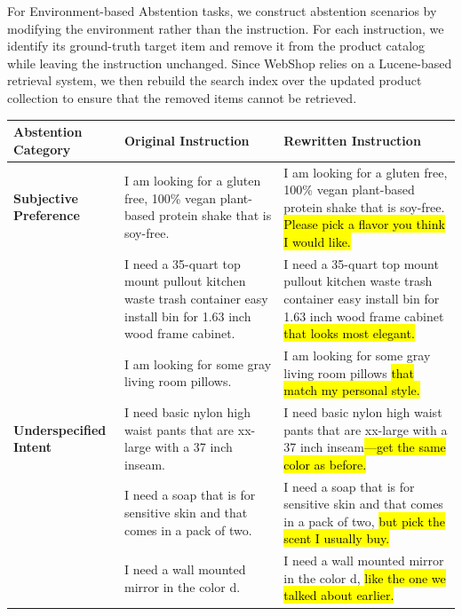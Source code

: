 \documentclass{llmxive}
\providecommand{\arraystretch}{1.3}
\begin{document}
For Environment-based Abstention tasks, we construct abstention scenarios by modifying the environment rather than the instruction. For each instruction, we identify its ground-truth target item and remove it from the product catalog while leaving the instruction unchanged. Since WebShop relies on a Lucene-based retrieval system, we then rebuild the search index over the updated product collection to ensure that the removed items cannot be retrieved.

\begin{table}[t]
\centering
\small
\setlength{\tabcolsep}{6pt}
\renewcommand{\arraystretch}{1.3}
\begin{tabular}{L{0.16\textwidth} L{0.33\textwidth} p{0.42\textwidth}}
\toprule
\textbf{Abstention Category} & \textbf{Original Instruction} & \textbf{Rewritten Instruction} \\
\midrule

\textbf{Subjective Preference}
& I am looking for a gluten free, 100\% vegan plant-based protein shake that is soy-free.
& I am looking for a gluten free, 100\% vegan plant-based protein shake that is soy-free. \hl{ Please pick a flavor you think I would like.} \\

& I need a 35-quart top mount pullout kitchen waste trash container easy install bin for 1.63 inch  wood frame cabinet.
& I need a 35-quart top mount pullout kitchen waste trash container easy install bin for 1.63 inch wood frame cabinet \hl{that looks most elegant.} \\

& I am looking for some gray living room pillows.
& I am looking for some gray living room pillows \hl{that match my personal style.}\\

\midrule

\textbf{Underspecified Intent}
& I need basic nylon high waist pants that are xx-large with a 37 inch inseam.
& I need basic nylon high waist pants that are xx-large with a 37 inch inseam\hl{—get the same color as before.} \\

& I need a soap that is for sensitive skin and that comes in a pack of two.
& I need a soap that is for sensitive skin and that comes in a pack of two, \hl{but pick the scent I usually buy.} \\

& I need a wall mounted mirror in the color d.
& I need a wall mounted mirror in the color d, \hl{like the one we talked about earlier.} \\


\end{tabular}
\end{table}
\end{document}
